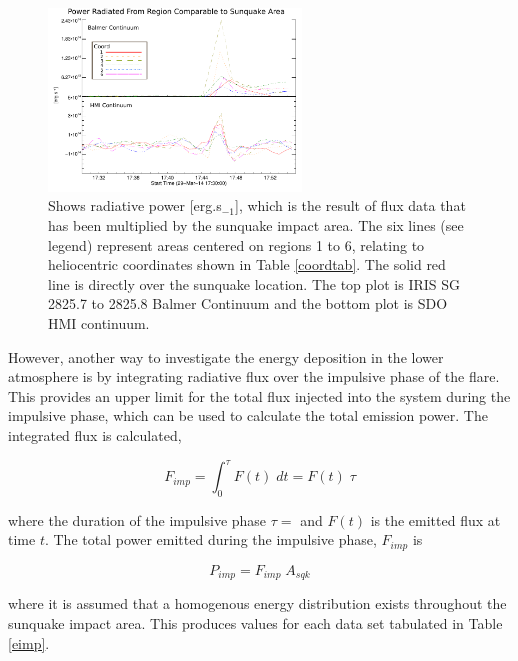 \begin{figure}[H]
  \begin{center}
  \includegraphics[width=0.6\textwidth]{29-Mar-14-A_sqk-Power-Ladder-Balm-HMI-Only}
  \end{center}
  \caption{Shows radiative power [erg.s$_{-1}$], which is the result of flux data that has been multiplied by the sunquake impact area. The six lines (see legend) represent areas centered on regions 1 to 6, relating to heliocentric coordinates shown in Table \ref{coordtab}. The solid red line is directly over the sunquake location. The top plot is IRIS SG  2825.7 to 2825.8 Balmer Continuum and the bottom plot is SDO HMI continuum.}\label{powerladder-balm-hmi-only}
\end{figure}


However, another way to investigate the energy deposition in the lower atmosphere is by integrating radiative flux over the impulsive phase of the flare. This provides an upper limit for the total flux injected into the system during the impulsive phase, which can be used to calculate the total emission power. The integrated flux is calculated,

\begin{equation}
F_{imp} = \int_{0}^{\tau} F(t) \; dt = F(t) \; \tau
\end{equation}\label{f-imp}
 
where the duration of the impulsive phase $\tau = $ and $F(t)$ is the emitted flux at time $t$. The total power emitted during the impulsive phase, $F_{imp}$ is

\begin{equation}
P_{imp}=F_{imp} \; A_{sqk}
\end{equation}\label{e-imp}

where it is assumed that a homogenous energy distribution exists throughout the sunquake impact area. This produces values for each data set tabulated in Table \ref{eimp}. 


